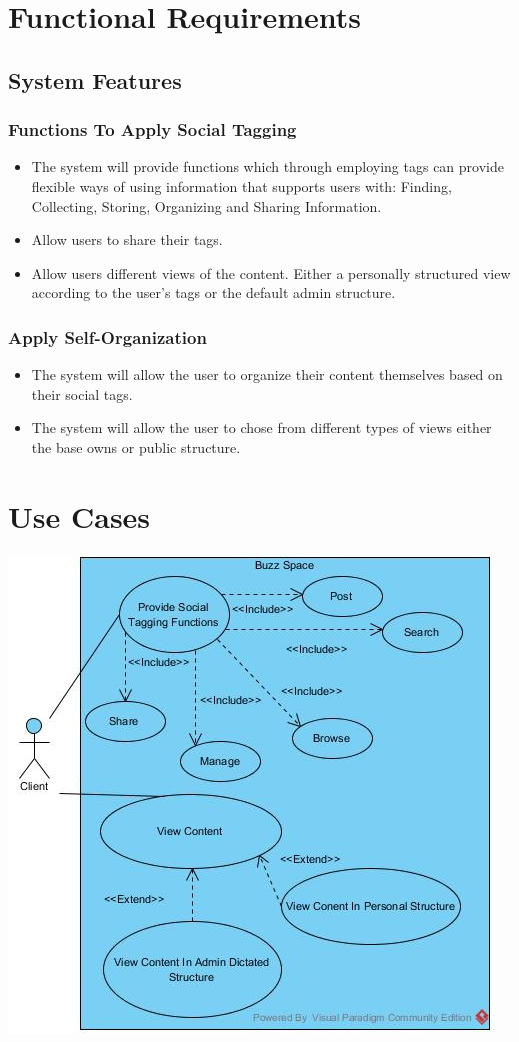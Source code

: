 \documentclass[12pt, oneside]{article}
\begin{document}
\section{Functional Requirements}

\subsection{System Features}

\subsubsection{Functions To Apply Social Tagging}
\begin{itemize}
\item The system will provide functions which through employing tags can provide flexible ways of using information that supports users with: Finding, Collecting, Storing, Organizing and Sharing Information.
\item Allow users to share their tags.
\item Allow users different views of the content. Either a personally structured view according to the user's tags or the default admin structure.
\end{itemize}

\subsubsection{Apply Self-Organization}
\begin{itemize}
\item The system will allow the user to organize their content themselves based on their social tags.
\item The system will allow the user to chose from different types of views either the base owns or public structure.
\end{itemize}

\section{Use Cases}
  \includegraphics{u29630135_socialTagging.jpg}
    \rule{0\linewidth}{0.15\linewidth}\par
\end{document}
